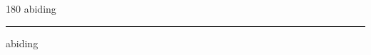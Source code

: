 
\begin{frame}
\begin{center}
\begin{turn}{180}
{\fontsize{2.5cm}{1em}\selectfont abiding}
\end{turn}
\vspace{1em}\par  
\hrule
\vspace{1em}\par  
{\fontsize{2.5cm}{1em}\selectfont abiding}
\end{center}
\end{frame}
